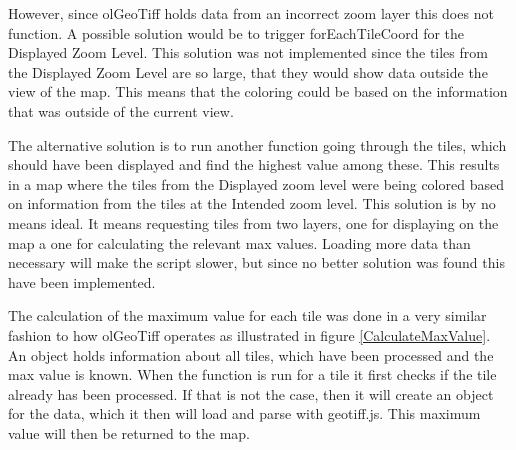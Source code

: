 
However, since olGeoTiff holds data from an incorrect zoom layer this does not function. A possible solution would be to trigger forEachTileCoord for the Displayed Zoom Level. This solution was not implemented since the tiles from the Displayed Zoom Level are so large, that they would show data outside the view of the map. This means that the coloring could be based on the information that was outside of the current view.

The alternative solution is to run another function going through the tiles, which should have been displayed and find the highest value among these. This results in a map where the tiles from the Displayed zoom level were being colored based on information from the tiles at the Intended zoom level. This solution is by no means ideal. It means requesting tiles from two layers, one for displaying on the map a one for calculating the relevant max values. Loading more data than necessary will make the script slower, but since no better solution was found this have been implemented.

The calculation of the maximum value for each tile was done in a very similar fashion to how olGeoTiff operates as illustrated in figure \ref{CalculateMaxValue}. An object holds information about all tiles, which have been processed and the max value is known. When the function is run for a tile it first checks if the tile already has been processed. If that is not the case, then it will create an object for the data, which it then will load and parse with geotiff.js. %
This maximum value will then be returned to the map. 

